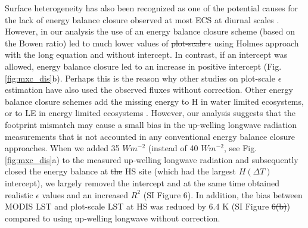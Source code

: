 \documentclass[fleqn,10pt]{wlscirep}
\providecommand{\DIFaddtex}[1]{{\protect\color{blue}\uwave{#1}}} %
\providecommand{\DIFdeltex}[1]{{\protect\color{red}\sout{#1}}}                      %
\providecommand{\DIFaddbegin}{} %
\providecommand{\DIFaddend}{} %
\providecommand{\DIFdelbegin}{} %
\providecommand{\DIFdelend}{} %
\providecommand{\DIFadd}[1]{\texorpdfstring{\DIFaddtex{#1}}{#1}} %
\providecommand{\DIFdel}[1]{\texorpdfstring{\DIFdeltex{#1}}{}} %
\begin{document}
Surface heterogeneity has also been recognized as one of the potential causes for the lack of energy balance closure observed at most ECS at diurnal scales \cite{wilson2002energy, stoy2013data}. However, in our analysis the use of an energy balance closure scheme (based on the Bowen ratio) led to much lower values of \DIFdelbegin \DIFdel{plot-scale $\epsilon$ }\DIFdelend \DIFaddbegin \DIFadd{$\epsilon_{plot}$ }\DIFaddend using Holmes approach with the long equation and without intercept. In contrast, if an intercept was allowed, energy balance closure led to an increase in positive intercept (Fig. \ref{fig:mxc_dis}b). Perhaps this is the reason why other studies on plot-scale $\epsilon$ estimation have also used the observed fluxes without correction\cite{holmes2009land,holmes2016cloud,maes2019potential}. Other energy balance closure schemes add the missing energy to H in water limited ecosystems\cite{twine2000correcting}, or to LE in energy limited ecosystems \cite{chakraborty2019biases}. However, our analysis suggests that the footprint mismatch may cause a small bias in the up-welling longwave radiation measurements that is not accounted in any conventional energy balance closure approaches. When we added 35 $Wm^{-2}$ (instead of 40 $Wm^{-2}$, see Fig. \ref{fig:mxc_dis}a) to the measured up-welling longwave radiation and subsequently closed the energy balance at \DIFdelbegin \DIFdel{the }\DIFdelend HS site (which had the largest $H(\Delta T)$ intercept), we largely removed the intercept and at the same time obtained realistic $\epsilon$ values and an increased $R^2$ (SI Figure 6). In addition, the bias between MODIS LST and plot-scale LST at HS was reduced by 6.4 K (SI Figure \DIFdelbegin \DIFdel{6(b)}\DIFdelend \DIFaddbegin \DIFadd{6b}\DIFaddend ) compared to using up-welling longwave without correction. 
\end{document}
